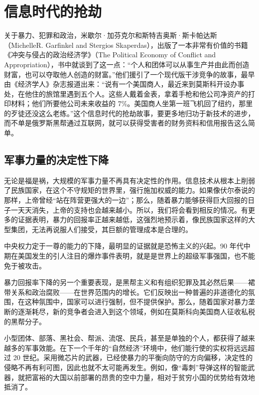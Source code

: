 \section{信息时代的抢劫}

关于暴力、犯罪和政治，米歇尔·加芬克尔和斯特吉奥斯·斯卡帕达斯（MichelleR. Garfinkel and Stergios Skaperdas），出版了一本非常有价值的书籍《冲突与侵占的政治经济学》（The Political Economy of Conflict and Appropriation），书中就谈到了这一点：“个人和团体可以从事生产并由此而创造财富，也可以夺取他人创造的财富。”他们援引了一个现代版干涉竞争的故事，最早由《经济学人》杂志报道出来：“说有一个美国商人，最近来到莫斯科开设办事处，在他住的旅馆里遇到五个人。这些人戴着金表，拿着手枪和他公司净资产的打印材料；他们所要他公司未来收益的 7\%。美国商人坐第一班飞机回了纽约，那里的歹徒还没这么老练。”这个信息时代的抢劫故事，要更多地归功于新技术的进步，而不单是俄罗斯黑帮通过互联网，就可以获得受害者的财务资料和信用报告这么简单。

\subsection{军事力量的决定性下降}

无论是福是祸，大规模的军事力量不再具有决定性的作用。信息技术从根本上削弱了民族国家，在这个不守规矩的世界里，强行施加权威的能力。如果像伏尔泰说的那样，上帝曾经“站在阵营更强大的一边”；那么，随着暴力能够获得巨大回报的日子一天天消失，上帝的支持也会越来越小。所以，我们将会看到相反的情况。有更多的证据表明，暴力的回报率正越来越低，这强烈地预示着，像民族国家这样的大型集团，无法再说服人们接受，其巨额的管理成本是合理的。

中央权力定于一尊的能力的下降，最明显的证据就是恐怖主义的兴起。90 年代中期在美国发生的引人注目的爆炸事件表明，就是是世界上的超级军事强国，也不能免于被攻击。

暴力回报率下降的另一个重要表现，是黑帮主义和有组织犯罪及其必然后果——裙带关系和政治腐败——在世界范围内的增长。它们反映出一种普遍的非道德化的氛围，在这种氛围中，国家可以进行强制，但不提供保护。那么，随着国家对暴力垄断的逐渐耗尽，新的竞争者会进入到这个领域，例如在莫斯科向美国商人征收私税的黑帮分子。

小型团体、部落、黑社会、帮派、流氓、民兵，甚至是单独的个人，都获得了越来越多的军事效能。在下一个千年的“自然经济”环境中，他们能行使的实权将远远超过 20 世纪。采用微芯片的武器，已经使暴力的平衡向防守的方向偏移，决定性的侵略不再有利可图，因此也就不太可能再发生。例如，像“毒刺”导弹这样的智能武器，就把富裕的大国以前部署的昂贵的空中力量，相对于贫穷小国的优势给有效地抵消了。

